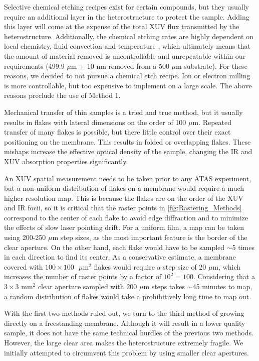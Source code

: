 Selective chemical etching recipes exist for certain compounds, but they usually require an additional layer in the heterostructure to protect the sample. Adding this layer will come at the expense of the total XUV flux transmitted by the heterostructure. Additionally, the chemical etching rates are highly dependent on local chemistry, fluid convection and temperature \cite{chiuPhotoluminescenceEvolutionGaAs2015}, which ultimately means that the amount of material removed is uncontrollable and unrepeatable within our requirements (499.9 $\mu$m $\pm$ 10 nm removed from a 500 $\mu$m substrate). For these reasons, we decided to not pursue a chemical etch recipe. Ion or electron milling is more controllable, but too expensive to implement on a large scale. The above reasons preclude the use of Method 1.

Mechanical transfer of thin samples is a tried and true method, but it usually results in flakes with lateral dimensions on the order of 100 $\mu$m. Repeated transfer of many flakes is possible, but there little control over their exact positioning on the membrane. This results in folded or overlapping flakes. These mishaps increase the effective optical density of the sample, changing the IR and XUV absorption properties significantly.

An XUV spatial measurement needs to be taken prior to any ATAS experiment, but a non-uniform distribution of flakes on a membrane would require a much higher resolution map. This is because the flakes are on the order of the XUV and IR focii, so it is critical that the raster points in \cref{fig:Rastering_Methods} correspond to the center of each flake to avoid edge diffraction and to minimize the effects of slow laser pointing drift. For a uniform film, a map can be taken using 200-250 $\mu$m step sizes, as the most important feature is the border of the clear aperture. On the other hand, each flake would have to be sampled $\sim$5 times in each direction to find its center. As a conservative estimate, a membrane covered with $100 \times 100\text{ }\mu$m$^2$ flakes would require a step size of 20 $\mu$m, which increases the number of raster points by a factor of $10^2 = 100$. Considering that a $3 \times 3 \text{ mm}^2$ clear aperture sampled with 200 $\mu$m steps takes $\sim$45 minutes to map, a random distribution of flakes would take a prohibitively long time to map out.

With the first two methods ruled out, we turn to the third method of growing directly on a freestanding membrane. Although it will result in a lower quality sample, it does not have the same technical hurdles of the previous two methods. However, the large clear area makes the heterostructure extremely fragile. We initially attempted to circumvent this problem by using smaller clear apertures.

